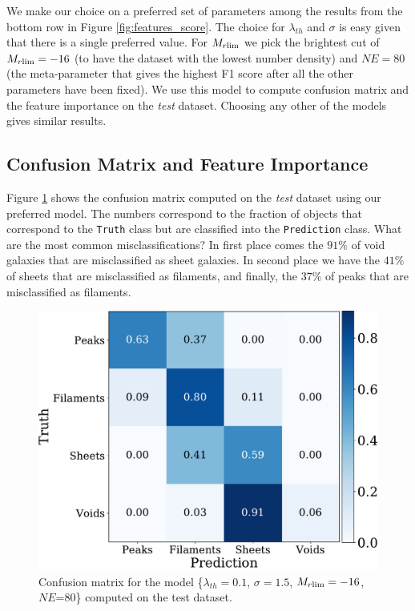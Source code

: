 \documentclass[usenatbib]{mnras}
\begin{document}
We make our choice on a preferred set of parameters among the results from the bottom row in Figure \ref{fig:features_score}.
The choice for $\lambda_{th}$ and $\sigma$ is easy given that there is a single preferred value.
For $M_{r\rm lim}$ we pick the brightest cut of $M_{r\rm lim}=-16$ (to have the dataset with the lowest number density) and $NE=80$ (the meta-parameter that gives the highest F1 score after all the other parameters have been fixed).
We use this model to compute confusion matrix and the feature importance on the \emph{test} dataset.
Choosing any other of the models gives similar results.



\subsection{Confusion Matrix and Feature Importance}

Figure \ref{fig:confusion_matrix} shows the confusion matrix computed on the \emph{test} dataset using our preferred model.
The numbers correspond to the fraction of objects that correspond to
the \verb"Truth" class but are classified into the \verb"Prediction" class.
What are the most common misclassifications?
In first place comes the $91\%$ of void galaxies that are misclassified as sheet galaxies.  
In second place we have the $41\%$ of sheets that are misclassified
as filaments, and finally, the $37\%$ of peaks that are misclassified as filaments.

\begin{figure}
\centering
    \includegraphics[scale=0.35]{Figs/p_confusion_matrix_test.pdf}
\caption{Confusion matrix for the model 
      \{$\lambda_{th}=0.1$, $\sigma=1.5$, $M_{r\rm lim}=-16$,
      $NE$=80\} computed on the test dataset.}
      \label{fig:confusion_matrix}
\end{figure}
\end{document}
